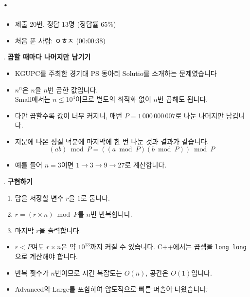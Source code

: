 
\section{\texorpdfstring{\pletter. \ptitle}{문제 \pletter}}

\begin{frame}[label=problem-A]
    \sectiontitle{\pletter}{\ptitle}
    \begin{itemize}
        \item 제출 20번, 정답 13명 (정답률 65\%)
        \item 처음 푼 사람: ㅇㅎㅈ (00:00:38)
    \end{itemize}
\end{frame}

\begin{frame}{\textbf{\pletter}. \ptitle}
    \textbf{곱할 때마다 나머지만 남기기}
\begin{itemize}
        \item KGUPC를 주최한 경기대 PS 동아리 Solutio를 소개하는 문제였습니다

        \item $n^n$은 $n$을 $n$번 곱한 값입니다. \\
        Small에서는 $n\le10^4$이므로 별도의 최적화 없이 $n$번 곱해도 됩니다.
        \item 다만 곱할수록 값이 너무 커지니, 매번 $P=1\,000\,000\,007$로 나눈 나머지만 남깁니다.
        \item 지문에 나온 성질 덕분에 마지막에 한 번 나눈 것과 결과가 같습니다.
        \[
            (ab)\bmod P=((a\bmod P)(b\bmod P))\bmod P
        \]
        \item 예를 들어 $n=3$이면 $1\to3\to9\to27$로 계산합니다.
    \end{itemize}
\end{frame}

\begin{frame}{\textbf{\pletter}. \ptitle}
    \textbf{구현하기}
\begin{enumerate}
        \item 답을 저장할 변수 $r$을 $1$로 둡니다.
        \item $r=(r\times n)\bmod P$를 $n$번 반복합니다.
        \item 마지막 $r$을 출력합니다.
    \end{enumerate}
    \begin{itemize}
        \item $r<P$여도 $r\times n$은 약 $10^{13}$까지 커질 수 있습니다. \mbox{C++}에서는 곱셈을 \texttt{long long}으로 계산해야 합니다.
        \item 반복 횟수가 $n$번이므로 시간 복잡도는 $O(n)$, 공간은 $O(1)$입니다.
        \item \sout{Advanced의 Large를 포함하여 압도적으로 빠른 퍼솔이 나왔습니다.}
    \end{itemize}
\end{frame}
